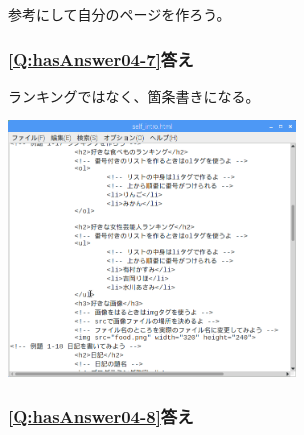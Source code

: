 \documentclass[a4paper,12pt]{jarticle}
\begin{document}
参考にして自分のページを作ろう。

\subsubsection{\bfseries
\ref*{Q:hasAnswer04-7}答え}

ランキングではなく、箇条書きになる。

\centering
\includegraphics[width=7.622cm]{textbook-img236.png}
\flushleft

\bigskip

\subsubsection{\bfseries
\ref*{Q:hasAnswer04-8}答え}
\end{document}
